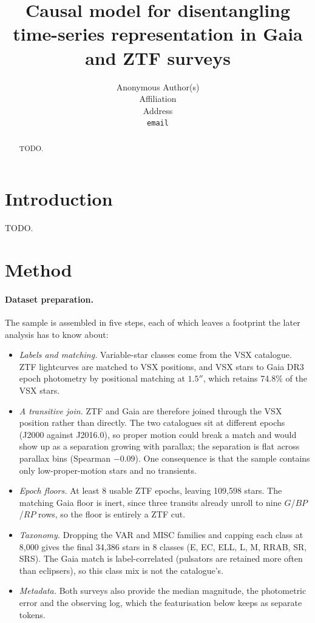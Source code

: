 \documentclass{article}
\title{Causal model for disentangling time-series representation in Gaia and ZTF surveys}
\author{%
  Anonymous Author(s) \\
  Affiliation \\
  Address \\
  \texttt{email} \\
}
\begin{document}
\maketitle

\begin{abstract}
TODO.
\end{abstract}

\section{Introduction}
TODO.

\section{Method}

\paragraph{Dataset preparation.}
The sample is assembled in five steps, each of which leaves a footprint the later analysis has to know about:
\begin{itemize}\itemsep0pt
\item \emph{Labels and matching.} Variable-star classes come from the VSX catalogue. ZTF lightcurves are matched to VSX positions, and VSX stars to Gaia DR3 epoch photometry by positional matching at $1.5''$, which retains 74.8\% of the VSX stars.
\item \emph{A transitive join.} ZTF and Gaia are therefore joined through the VSX position rather than directly. The two catalogues sit at different epochs (J2000 against J2016.0), so proper motion could break a match and would show up as a separation growing with parallax; the separation is flat across parallax bins (Spearman $-0.09$). One consequence is that the sample contains only low-proper-motion stars and no transients.
\item \emph{Epoch floors.} At least 8 usable ZTF epochs, leaving 109,598 stars. The matching Gaia floor is inert, since three transits already unroll to nine $G$/$BP$/$RP$ rows, so the floor is entirely a ZTF cut.
\item \emph{Taxonomy.} Dropping the VAR and MISC families and capping each class at 8,000 gives the final 34,386 stars in 8 classes (E, EC, ELL, L, M, RRAB, SR, SRS). The Gaia match is label-correlated (pulsators are retained more often than eclipsers), so this class mix is not the catalogue's.
\item \emph{Metadata.} Both surveys also provide the median magnitude, the photometric error and the observing log, which the featurisation below keeps as separate tokens.
\end{itemize}
\end{document}
